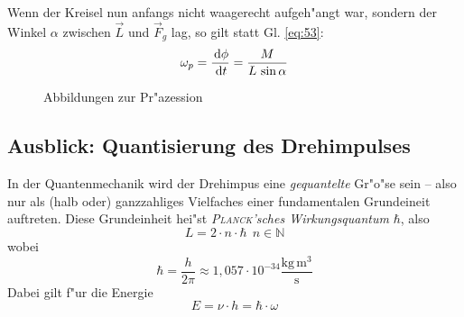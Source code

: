 \bigskip

Wenn der Kreisel nun anfangs nicht waagerecht aufgeh"angt war, sondern
der Winkel $\alpha$ zwischen $\vec L$ und $\vec F_g$ lag, so gilt
statt Gl. \eqref{eq:53}:
\begin{equation}
   \label{eq:54}
   \omega_p = \frac{\, \mathrm{d} \phi}{\, \mathrm{d} t} = \frac{M}{L \, \sin\alpha}
\end{equation}

\begin{figure}
   \centering {}
   \caption{Abbildungen zur Pr"azession}
   \label{abb_preazession}
\end{figure}






\subsection{Ausblick: Quantisierung des Drehimpulses}
\label{kap_ausblick:-quantisierung-des-drehimpulses}

In der Quantenmechanik wird der Drehimpus eine \emph{gequantelte}
Gr"o"se sein -- also nur als (halb oder) ganzzahliges Vielfaches einer
fundamentalen Grundeineit auftreten. Diese Grundeinheit hei"st
\emph{\textsc{Planck}'sches
  Wirkungsquantum} $\hbar$, also
$$
L = 2 \cdot n \cdot \hbar ~ ~  n \in \mathbb N
$$
wobei 
$$
\hbar = \frac{h}{2\pi} \approx 1,057 \cdot 10^{-34}
\frac{\operatorname{kg\,m^3}}{\operatorname{s}}
$$
Dabei gilt f"ur die Energie
$$
E = \nu \cdot h = \hbar \cdot \omega
$$

